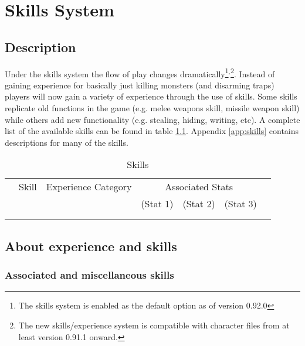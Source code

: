 
\chapter{Skills System}\label{chap:skills}

\section{Description}

Under the skills system the flow of play changes
dramatically\footnote{The skills system is enabled as the default option
as of version
0.92.0}$^{, }$\footnote{The new skills/experience system is compatible
with character files from at least version 0.91.1 onward.}.
Instead of gaining experience for basically just killing monsters (and disarming
traps) players will now gain a variety of experience through the use
of skills. Some skills replicate old functions in the game (e.g. melee
weapons skill, missile weapon skill) while others add new functionality
(e.g. stealing, hiding, writing, etc).  A complete list of the available
skills can be found in table \ref{tab:skill_stats}. Appendix \ref{app:skills}
contains descriptions for many of the skills.

\begin{table}
\begin{center}
\caption{Skills \label{tab:skill_stats}}
\small
\vskip 12pt
\begin{tabular}{|clccccc|} \hline
 & Skill & Experience Category & \multicolumn{3}{c}{Associated Stats} & \\
 & & & (Stat 1) & (Stat 2) & (Stat 3) & \\ \hline\hline
 & & & & & & \\

 & & & & & & \\
\hline
\end{tabular}
\end{center}
\end{table}


\section{About experience and skills}

\subsection{Associated and miscellaneous skills}

